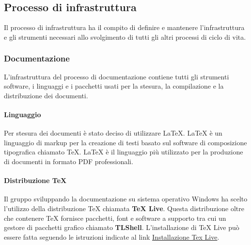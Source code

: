 \subsection{Processo di infrastruttura}
\label{subsec:proc_infrastruttura}
Il processo di infrastruttura ha il compito di definire e mantenere l'infrastruttura e gli strumenti necessari allo svolgimento di tutti gli altri processi di ciclo di vita.

\subsubsection{Documentazione}
L'infrastruttura del processo di documentazione contiene tutti gli strumenti software, i linguaggi e i pacchetti usati per la stesura, la compilazione e la distribuzione dei documenti.

\paragraph{Linguaggio}
\label{par:latex}
Per stesura dei documenti è stato deciso di utilizzare LaTeX.
LaTeX è un linguaggio di markup per la creazione di testi basato sul software di composizione tipografica chiamato TeX.
LaTeX è il linguaggio più utilizzato per la produzione di documenti in formato PDF professionali.


\paragraph{Distribuzione TeX}
Il gruppo sviluppando la documentazione su sistema operativo Windows ha scelto l'utilizzo della distribuzione TeX chiamata \textbf{TeX Live}.
Questa distribuzione oltre che contenere TeX fornisce pacchetti, font e software a supporto tra cui un gestore di pacchetti grafico chiamato \textbf{TLShell}.
L'installazione di TeX Live può essere fatta seguendo le istruzioni indicate al link \href{https://www.tug.org/texlive/windows.html}{Installazione Tex Live}.

